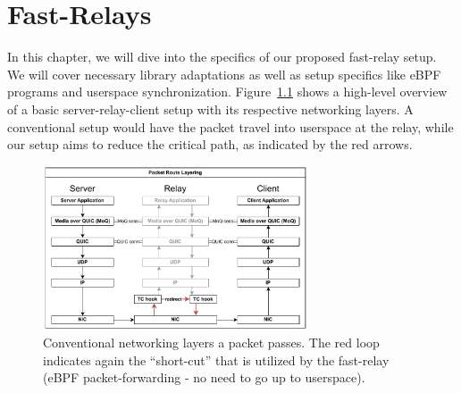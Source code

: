 
\chapter{Fast-Relays}\label{chap:fast_relays}

In this chapter, we will dive into the specifics of our proposed fast-relay setup.
We will cover necessary library adaptations as well as setup specifics like eBPF programs 
and userspace synchronization.
Figure~\ref{fig:route-layering} shows a high-level overview of a basic 
server-relay-client setup with its respective networking layers.
A conventional setup would have the packet travel into userspace at the relay, 
while our setup aims to reduce the critical path, as indicated by the red arrows.

\vspace{0.5cm}
\begin{figure}[htbp] %
    \centering
    \includegraphics[width=0.7\textwidth]{figures/03_fast_relays/route-layering.drawio.pdf}
    \caption[Packet path schematic regarding network stack]{Conventional networking layers a packet passes.
    The red loop indicates again the ``short-cut'' that is utilized by the fast-relay 
    (eBPF packet-forwarding {-} no need to go up to userspace).}\label{fig:route-layering}
\end{figure}








